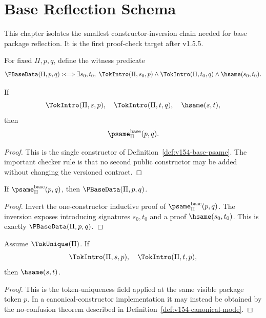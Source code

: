 \chapter{Base Reflection Schema}
\label{ch:v155-base-reflection-schema}

This chapter isolates the smallest constructor-inversion chain needed for base package reflection. It is the first proof-check target after v1.5.5.

\begin{definition}
\label{def:v155-psame-base-data}
For fixed \(\Pi,p,q\), define the witness predicate
\[
\PBaseData(\Pi,p,q) :\Longleftrightarrow
\exists s_0,t_0,\;\TokIntro(\Pi,s_0,p)\wedge\TokIntro(\Pi,t_0,q)\wedge\hsame(s_0,t_0).
\]
\end{definition}

\begin{lemma}
\label{lem:v155-psame-base-constructor}
If
\[
  \TokIntro(\Pi,s,p),\quad \TokIntro(\Pi,t,q),\quad \hsame(s,t),
\]
then
\[
  \psame_{\Pi}^{\mathrm{base}}(p,q).
\]
\end{lemma}

\begin{proof}
This is the single constructor of Definition~\ref{def:v154-base-psame}. The important checker rule is that no second public constructor may be added without changing the versioned contract.
\end{proof}

\begin{lemma}
\label{lem:v155-psame-base-inversion}
If \(\psame_{\Pi}^{\mathrm{base}}(p,q)\), then \(\PBaseData(\Pi,p,q)\).
\end{lemma}

\begin{proof}
Invert the one-constructor inductive proof of \(\psame_{\Pi}^{\mathrm{base}}(p,q)\). The inversion exposes introducing signatures \(s_0,t_0\) and a proof \(\hsame(s_0,t_0)\). This is exactly \(\PBaseData(\Pi,p,q)\).
\end{proof}

\begin{lemma}
\label{lem:v155-token-replacement}
Assume \(\TokUnique(\Pi)\). If
\[
  \TokIntro(\Pi,s,p),\quad \TokIntro(\Pi,t,p),
\]
then \(\hsame(s,t)\).
\end{lemma}

\begin{proof}
This is the token-uniqueness field applied at the same visible package token \(p\). In a canonical-constructor implementation it may instead be obtained by the no-confusion theorem described in Definition~\ref{def:v154-canonical-mode}.
\end{proof}

